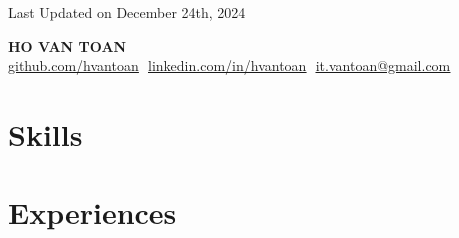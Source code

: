 \documentclass[letterpaper,11pt]{article}
\begin{document}


\begin{flushright}
	\vspace{-4pt}
	\color{gray}
	\item
	Last Updated on December 24th, 2024
\end{flushright}

\vspace{-5pt}

\begin{center}
	\textbf{\Huge\scshape{HO VAN TOAN}}\vspace{8pt} \\
	\small
	\href{https://github.com/hvantoan}{\underline{github.com/hvantoan}} $  $
	\href{https://linkedin.com/in/hvantoan}{\underline{linkedin.com/in/hvantoan}} $  $
	\href{mailto:it.vantoan@gmail.com}
	{\underline{it.vantoan@gmail.com}}
\end{center}

\section{Skills}
\resumeItemListEnd{}

\section{Experiences}
\end{document}
